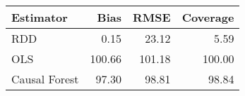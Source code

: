 \begin{table}[ht]
\centering
\begin{tabular}{lrrr}
  \hline
Estimator & Bias & RMSE & Coverage \\ 
  \hline
RDD & 0.15 & 23.12 & 5.59 \\ 
  OLS & 100.66 & 101.18 & 100.00 \\ 
  Causal Forest & 97.30 & 98.81 & 98.84 \\ 
   \hline
\end{tabular}
\end{table}
